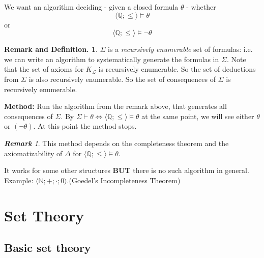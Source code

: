 \documentclass[a4paper,oneside,11pt,DIV=12,parskip=half]{scrartcl}
\newcommand{\LL}{\mathcal L}
\theoremstyle{plain}
\theoremstyle{definition}
\newtheorem{remark, definition}[theorem]{Remark and Definition.}
\newtheorem{lemma, definition}[theorem]{Lemma and Definition.}
\newtheorem{theorem, definition}[theorem]{Theorem and Definition.}
\theoremstyle{remark}
\newtheorem*{remark}{\textbf{Remark}}
\newtheorem*{remark, example}{\textbf{Remark and Exercise}}
\begin{document}
We want an algorithm deciding - given a closed formula $\theta$ - whether 
    \[ \langle \mathbb{Q}; \leq \rangle \vDash \theta  \] or 
    \[ \langle \mathbb{Q}; \leq \rangle \vDash \lnot \theta  \]

\begin{remark, definition}
     $\Sigma$ is a \emph{recursively enumerable} set of formulas: i.e. we can write an algorithm to systematically generate the formulas in $\Sigma$.
     Note that the set of axioms for $K_{\LL}$ is recursively enumerable. So the set of deductions from $\Sigma$ is also recursively enumerable. So the set of consequences of $\Sigma$ is recursively enumerable.
\end{remark, definition}

\textbf{Method:} Run the algorithm from the remark above, that generates all consequences of $\Sigma$. By $\Sigma \vdash \theta \Leftrightarrow \langle \mathbb{Q}; \leq \rangle \vDash \theta $ at the same point, we will see either $\theta$ or $(\lnot \theta)$. At this point the method stops.

\begin{remark}
This method depends on the completeness theorem and the axiomatizability of $\Delta$ for $\langle \mathbb{Q}; \leq \rangle \vDash \theta$.

It works for some other structures \textbf{BUT} there is no such algorithm in general. Example: $\langle \mathbb{N}; +;\cdot; 0 \rangle$.(Goedel's Incompleteness Theorem)

\end{remark}

\section{Set Theory}

\subsection{Basic set theory}
\end{document}
